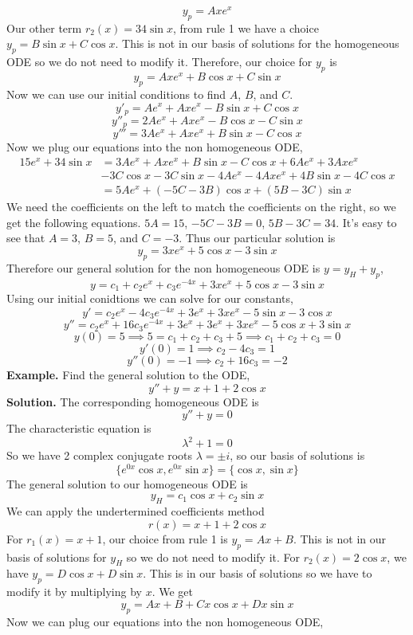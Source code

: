 \documentclass[openany]{report}
\begin{document}
\[y_p = Axe^x\]
Our other term $r_2(x) = 34\sin x$, from rule 1 we have a choice $y_p = B\sin x + C\cos x$. This is not in our basis of solutions for the homogeneous ODE so we do not need to modify it. Therefore, our choice for $y_p$ is
\[y_p = Axe^x + B\cos x + C \sin x\]
Now we can use our initial conditions to find $A$, $B$, and $C$.
\[y'_p = Ae^x + Axe^x - B\sin x + C \cos x\]
\[y''_p = 2Ae^x + Axe^x - B \cos x - C \sin x\]
\[y''' = 3Ae^x + Axe^x + B \sin x - C \cos x\]
Now we plug our equations into the non homogeneous ODE, 
\begin{align*}
    15e^x + 34\sin x &= 3Ae^x + Axe^x + B\sin x - C \cos x + 6Ae^x + 3Axe^x\\
    &-3C\cos x - 3C\sin x - 4Ae^x - 4Axe^x + 4B\sin x - 4C\cos x\\
    &= 5Ae^x + (-5C - 3B)\cos x + (5B - 3C)\sin x
\end{align*}
We need the coefficients on the left to match the coefficients on the right, so we get the following equations. $5A = 15$, $-5C - 3B = 0$, $5B - 3C = 34$. It's easy to see that $A = 3$, $B = 5$, and $C = -3$. Thus our particular solution is 
\[y_p = 3xe^x + 5\cos x - 3 \sin x \] 
Therefore our general solution for the non homogeneous ODE is $y = y_H + y_p$,
\[y = c_1 + c_2e^x + c_3e^{-4x} + 3xe^x + 5\cos x - 3 \sin x\]
Using our initial conidtions we can solve for our constants, 
\[y' = c_2e^x - 4c_3e^{-4x} + 3e^x + 3xe^x - 5 \sin x - 3 \cos x\]
\[y'' = c_2e^x + 16c_3e^{-4x} + 3e^x + 3e^x + 3xe^x - 5\cos x + 3 \sin x\]
\[y(0) = 5 \implies 5 = c_1 + c_2 + c_3 + 5 \implies c_1+ c_2 + c_3 = 0\]
\[y'(0) = 1 \implies c_2 - 4c_3 = 1\]
\[y''(0) = -1 \implies c_2 + 16c_3 = -2\]
\textbf{Example.} Find the general solution to the ODE, 
\[y'' + y = x+1 + 2\cos x\]
\textbf{Solution.} The corresponding homogeneous ODE is
\[y'' + y = 0\]
The characteristic equation is
\[\lambda^2 + 1 = 0\]
So we have 2 complex conjugate roots $\lambda = \pm i$, so our basis of solutions is
\[\{e^{0x}\cos x, e^{0x}\sin x\} = \{\cos x, \sin x\}\]
The general solution to our homogeneous ODE is 
\[y_H = c_1\cos x + c_2 \sin x\]
We can apply the undertermined coefficients method 
\[r(x) = x+1 + 2 \cos x\]
For $r_1(x) = x+1$, our choice from rule 1 is $y_p = Ax + B$. This is not in our basis of solutions for $y_H$ so we do not need to modify it. For $r_2(x) = 2 \cos x$, we have $y_p = D \cos x + D\sin x$. This is in our basis of solutions so we have to modify it by multiplying by $x$. We get 
\[y_p = Ax + B + Cx\cos x + Dx \sin x\]
Now we can plug our equations into the non homogeneous ODE,
\end{document}
